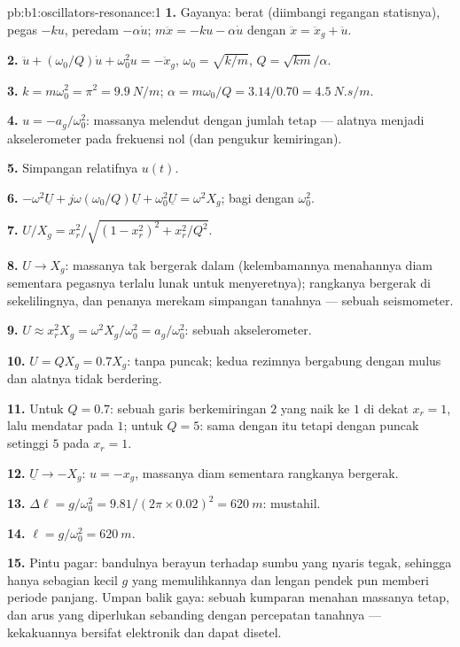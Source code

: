 \begin{solution}{pb:b1:oscillators-resonance:1}
\textbf{1.} Gayanya: berat (diimbangi regangan statisnya), pegas
$-ku$, peredam $-\alpha\dot u$; $m\ddot x = -ku - \alpha\dot u$ dengan $\ddot x =
\ddot x_g + \ddot u$.

\textbf{2.} $\ddot u + (\omega_0/Q)\dot u + \omega_0^2u = -\ddot x_g$, $\omega_0 =
\sqrt{k/m}$, $Q = \sqrt{km}/\alpha$.

\textbf{3.} $k = m\omega_0^2 = \pi^2 = \qty{9.9}{N/m}$; $\alpha = m\omega_0/Q =
3.14/0.70 = \qty{4.5}{N.s/m}$.

\textbf{4.} $u = -a_g/\omega_0^2$: massanya melendut dengan jumlah tetap ---
alatnya menjadi akselerometer pada frekuensi nol (dan pengukur kemiringan).

\textbf{5.} Simpangan relatifnya $u(t)$.

\textbf{6.} $-\omega^2\underline U + j\omega(\omega_0/Q)\underline U + \omega_0^2\underline U
= \omega^2X_g$; bagi dengan $\omega_0^2$.

\textbf{7.} $U/X_g = x_r^2/\sqrt{(1 - x_r^2)^2 + x_r^2/Q^2}$.

\textbf{8.} $U \to X_g$: massanya tak bergerak dalam 
(kelembamannya menahannya diam sementara pegasnya terlalu lunak untuk
menyeretnya); rangkanya bergerak di sekelilingnya, dan penanya merekam
simpangan tanahnya --- sebuah seismometer.

\textbf{9.} $U \approx x_r^2X_g = \omega^2X_g/\omega_0^2 = a_g/\omega_0^2$: sebuah
akselerometer.

\textbf{10.} $U = QX_g = 0.7X_g$: tanpa puncak; kedua rezimnya bergabung
dengan mulus dan alatnya tidak berdering.

\textbf{11.} Untuk $Q = 0.7$: sebuah garis berkemiringan $2$ yang naik
ke $1$ di dekat $x_r = 1$, lalu mendatar pada $1$; untuk $Q = 5$: sama
dengan itu tetapi dengan puncak setinggi $5$ pada $x_r = 1$.

\textbf{12.} $\underline U \to -X_g$: $u = -x_g$, massanya diam sementara
rangkanya bergerak.

\textbf{13.} $\Delta\ell = g/\omega_0^2 = 9.81/(2\pi \times 0.02)^2 = \qty{620}{m}$:
mustahil.

\textbf{14.} $\ell = g/\omega_0^2 = \qty{620}{m}$.

\textbf{15.} Pintu pagar: bandulnya berayun terhadap sumbu yang nyaris
tegak, sehingga hanya sebagian kecil $g$ yang memulihkannya dan lengan
pendek pun memberi periode panjang. Umpan balik gaya: sebuah kumparan
menahan massanya tetap, dan arus yang diperlukan sebanding dengan
percepatan tanahnya --- kekakuannya bersifat elektronik dan dapat disetel.


\end{solution}
